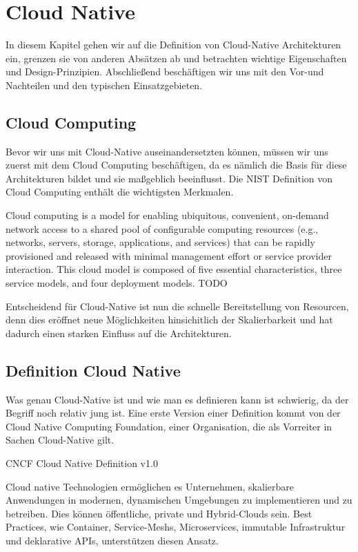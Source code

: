 \chapter{Cloud Native}

In diesem Kapitel gehen wir auf die Definition von Cloud-Native Architekturen ein, grenzen sie von anderen Absätzen ab und betrachten wichtige Eigenschaften und Design-Prinzipien. Abschließend beschäftigen wir uns mit den Vor-und Nachteilen und den typischen Einsatzgebieten.

\section{Cloud Computing}
Bevor wir uns mit Cloud-Native auseinandersetzten können, müssen wir uns zuerst mit dem Cloud Computing beschäftigen, da es nämlich die Basis für diese Architekturen bildet und sie maßgeblich beeinflusst. Die NIST Definition von Cloud Computing enthält die wichtigsten Merkmalen.

Cloud computing is a model for enabling ubiquitous, convenient, on-demand network access to a shared pool of configurable computing resources (e.g., networks, servers, storage, applications, and services) that can be rapidly provisioned and released with minimal management effort or service provider interaction. This cloud model is composed of five essential characteristics, three service models, and four deployment models. TODO

Entscheidend für Cloud-Native ist nun die schnelle Bereitstellung von Resourcen, denn dies eröffnet neue Möglichkeiten hinsichitlich der Skalierbarkeit und hat dadurch einen starken Einfluss auf die Architekturen.

\section{Definition Cloud Native}
Was genau Cloud-Native ist und wie man es definieren kann ist schwierig, da der Begriff noch relativ jung ist. Eine erste Version einer Definition kommt von der Cloud Native Computing Foundation, einer Organisation, die als Vorreiter in Sachen Cloud-Native gilt.

CNCF Cloud Native Definition v1.0

Cloud native Technologien ermöglichen es Unternehmen, skalierbare Anwendungen in modernen, dynamischen Umgebungen zu implementieren und zu betreiben. Dies können öffentliche, private und Hybrid-Clouds sein. Best Practices, wie Container, Service-Meshs, Microservices, immutable Infrastruktur und deklarative APIs, unterstützen diesen Ansatz.

